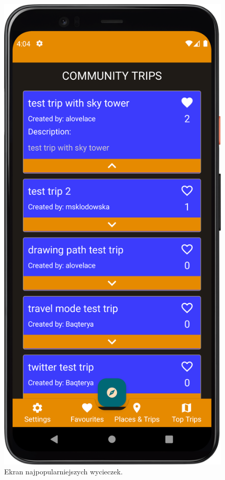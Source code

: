         \vspace{1cm}
        \begin{figure}[H]
            \centering
            \includegraphics[scale=0.10]{src/app/top_trips.png}
            \caption{Ekran najpopularniejszych wycieczek.\label{top_trips}}
            \qquad
        \end{figure} 
        \vspace{1cm}